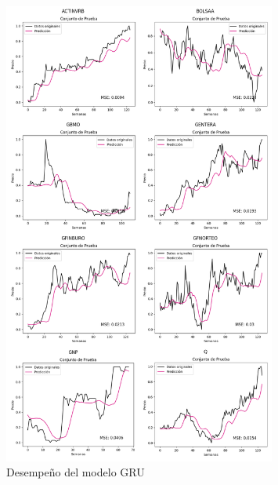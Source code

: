 \begin{figure}[H]
    \centering
    \includegraphics[width=0.8\textwidth]{Figuras/analisis/GRU.png}
    \caption{Desempeño del modelo GRU} 
    \label{fig:desempenio_GRU}
\end{figure}

